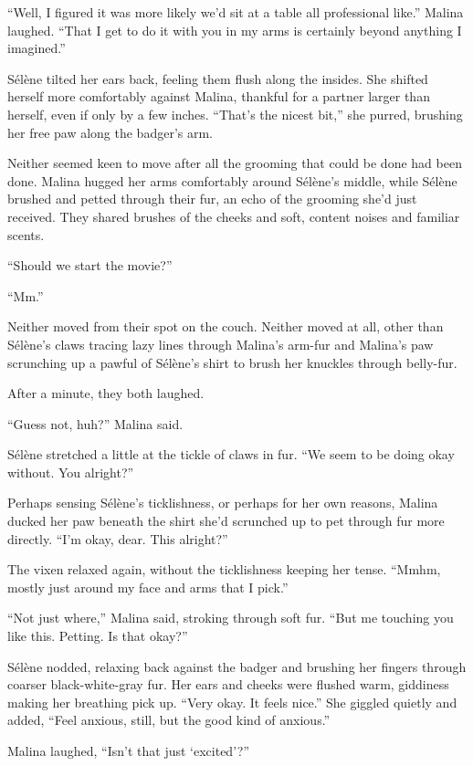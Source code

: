``Well, I figured it was more likely we'd sit at a table all professional like.'' Malina laughed. ``That I get to do it with you in my arms is certainly beyond anything I imagined.''

Sélène tilted her ears back, feeling them flush along the insides. She shifted herself more comfortably against Malina, thankful for a partner larger than herself, even if only by a few inches. ``That's the nicest bit,'' she purred, brushing her free paw along the badger's arm.

Neither seemed keen to move after all the grooming that could be done had been done. Malina hugged her arms comfortably around Sélène's middle, while Sélène brushed and petted through their fur, an echo of the grooming she'd just received. They shared brushes of the cheeks and soft, content noises and familiar scents.

``Should we start the movie?''

``Mm.''

Neither moved from their spot on the couch. Neither moved at all, other than Sélène's claws tracing lazy lines through Malina's arm-fur and Malina's paw scrunching up a pawful of Sélène's shirt to brush her knuckles through belly-fur.

After a minute, they both laughed.

``Guess not, huh?'' Malina said.

Sélène stretched a little at the tickle of claws in fur. ``We seem to be doing okay without. You alright?''

Perhaps sensing Sélène's ticklishness, or perhaps for her own reasons, Malina ducked her paw beneath the shirt she'd scrunched up to pet through fur more directly. ``I'm okay, dear. This alright?''

The vixen relaxed again, without the ticklishness keeping her tense. ``Mmhm, mostly just around my face and arms that I pick.''

``Not just where,'' Malina said, stroking through soft fur. ``But me touching you like this. Petting. Is that okay?''

Sélène nodded, relaxing back against the badger and brushing her fingers through coarser black-white-gray fur. Her ears and cheeks were flushed warm, giddiness making her breathing pick up. ``Very okay. It feels nice.'' She giggled quietly and added, ``Feel anxious, still, but the good kind of anxious.''

Malina laughed, ``Isn't that just `excited'?''

